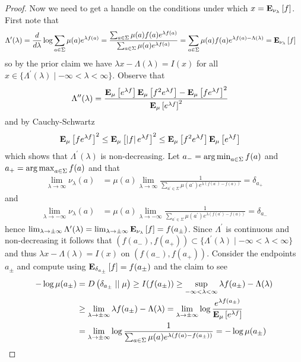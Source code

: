 \begin{proof}
Now we need to get a handle on the conditions under which
$x = \sexpectation{f}{\nu_\lambda}$.  First note that
\begin{align*}
\Lambda^\prime(\lambda) &=\frac{d}{d\lambda} \log \sum_{a \in \Sigma} \mu(a) e^{\lambda f(a)} 
=\frac{\sum_{a \in \Sigma} \mu(a) f(a) e^{\lambda f(a)}}{\sum_{a \in \Sigma} \mu(a) e^{\lambda f(a)}}
=\sum_{a \in \Sigma} \mu(a) f(a) e^{\lambda f(a) - \Lambda(\lambda)} 
= \sexpectation{f}{\nu_\lambda}
\end{align*}
so by the prior claim we have $\lambda x - \Lambda(\lambda) = I(x)$ for all $x \in \lbrace \Lambda^{\prime}(\lambda) \mid -\infty < \lambda < \infty \rbrace$.
Observe that 
\begin{align*}
\Lambda^{\prime \prime}(\lambda) &= 
\frac{\sexpectation{e^{\lambda f}}{\mu}\sexpectation{f^2 e^{\lambda f}}{\mu} - \sexpectation{f e^{\lambda f}}{\mu}^2}{\sexpectation{e^{\lambda f}}{\mu}^2}
\end{align*}
and by Cauchy-Schwartz
\begin{align*}
\sexpectation{f e^{\lambda f}}{\mu}^2 &\leq \sexpectation{\abs{f} e^{\lambda f}}{\mu}^2 \leq \sexpectation{f^2 e^{\lambda f}}{\mu}\sexpectation{e^{\lambda f}}{\mu}
\end{align*}
which shows that $\Lambda^\prime(\lambda)$ is non-decreasing.  Let $a_- = \argmin_{a \in \Sigma} f(a)$ and $a_+ = \argmax_{a \in \Sigma} f(a)$ and that
\begin{align*}
\lim_{\lambda \to \infty} \nu_\lambda(a) &= \mu(a) \lim_{\lambda \to \infty} \frac{1}{\sum_{a^\prime \in \Sigma}\mu(a^\prime) e^{\lambda(f(a^\prime) - f(a))} }= \delta_{a_+}
\end{align*}
and
\begin{align*}
\lim_{\lambda \to -\infty} \nu_\lambda(a) &= \mu(a) \lim_{\lambda \to -\infty} \frac{1}{\sum_{a^\prime \in \Sigma} \mu(a^\prime) e^{\lambda(f(a^\prime) - f(a))} } = \delta_{a_-}
\end{align*}
hence $\lim_{\lambda \to \pm \infty} \Lambda^\prime(\lambda) = \lim_{\lambda \to \pm \infty}  \sexpectation{f}{\nu_\lambda} = f(a_\pm)$.  Since $\Lambda^\prime$ is continuous and non-decreasing it follows that $(f(a_-), f(a_+)) \subset \lbrace \Lambda^{\prime}(\lambda) \mid -\infty < \lambda < \infty \rbrace$ and thus
$\lambda x - \Lambda(\lambda) = I(x)$ on $(f(a_-), f(a_+))$.  Consider the endpoints $a_\pm$ and compute using $\sexpectation{f}{\delta_{a_\pm}} = f(a_\pm)$
and the claim to see
\begin{align*}
-\log \mu(a_\pm) &= \kldiv{\delta_{a_\pm}}{\mu} \geq I(f(a_\pm)) \geq \sup_{-\infty < \lambda < \infty} \lambda f(a_\pm) - \Lambda(\lambda) \\
&\geq \lim_{\lambda \to \pm\infty} \lambda f(a_\pm) - \Lambda(\lambda) = \lim_{\lambda \to \pm\infty} \log \frac{e^{\lambda f(a_\pm)}}{\sexpectation{e^{\lambda f}}{\mu}}\\
&= \lim_{\lambda \to \pm\infty} \log \frac{1}{\sum_{a\in \Sigma} \mu(a) e^{\lambda(f(a) - f(a_\pm))} }= - \log \mu(a_\pm)
\end{align*}
\end{proof}

